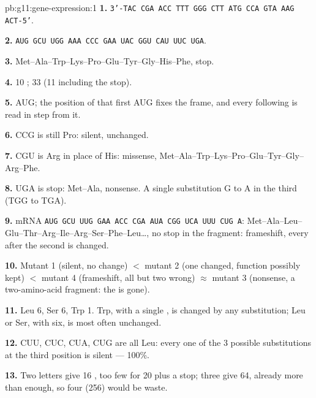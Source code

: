 \begin{solution}{pb:g11:gene-expression:1}
\textbf{1.} \texttt{3'-TAC CGA ACC TTT GGG CTT ATG CCA GTA AAG ACT-5'}.

\textbf{2.} \texttt{AUG GCU UGG AAA CCC GAA UAC GGU CAU UUC UGA}.

\textbf{3.} Met--Ala--Trp--Lys--Pro--Glu--Tyr--Gly--His--Phe, stop.

\textbf{4.} 10 ; 33  (11  including the
stop).

\textbf{5.} AUG; the position of that first AUG fixes the frame, and
every following  is read in step from it.

\textbf{6.} CCG is still Pro: silent,  unchanged.

\textbf{7.} CGU is Arg in place of His: missense,
Met--Ala--Trp--Lys--Pro--Glu--Tyr--Gly--Arg--Phe.

\textbf{8.} UGA is stop: Met--Ala, nonsense. A single substitution G
to A in the third  (TGG to TGA).

\textbf{9.} mRNA \texttt{AUG GCU UUG GAA ACC CGA AUA CGG UCA UUU CUG
A}: Met--Ala--Leu--Glu--Thr--Arg--Ile--Arg--Ser--Phe--Leu\dots, no stop
in the fragment: frameshift, every  after the second is
changed.

\textbf{10.} Mutant 1 (silent, no change) $<$ mutant 2 (one 
changed, function possibly kept) $<$ mutant 4 (frameshift, all but two
 wrong) $\approx$ mutant 3 (nonsense, a two-amino-acid
fragment: the  is gone).

\textbf{11.} Leu 6, Ser 6, Trp 1. Trp, with a single , is changed
by any substitution; Leu or Ser, with six, is most often unchanged.

\textbf{12.} CUU, CUC, CUA, CUG are all Leu: every one of the 3
possible substitutions at the third position is silent --- 100\%.

\textbf{13.} Two letters give 16 , too few for 20 
plus a stop; three give 64, already more than enough, so four (256)
would be waste.


\end{solution}

